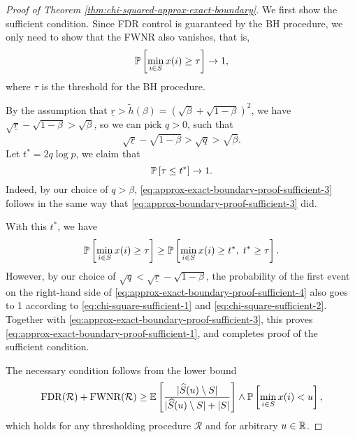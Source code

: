\begin{proof}[Proof of Theorem \ref{thm:chi-squared-approx-exact-boundary}]
We first show the sufficient condition.
Since FDR control is guaranteed by the BH procedure, we only need to show that the FWNR also vanishes, that is,
\begin{equation} \label{eq:approx-exact-boundary-proof-sufficient-1}
    \P\left[\min_{i\in S}x(i) \ge \tau\right] \to 1,
\end{equation}
where $\tau$ is the threshold for the BH procedure.

By the assumption that $\underline{r}>\widetilde{h}(\beta)=(\sqrt{\beta}+\sqrt{1-\beta})^2$, we have $\sqrt{\underline{r}}-\sqrt{1-\beta}>\sqrt{\beta}$, so we can pick $q>0$, such that 
\begin{equation} \label{eq:approx-exact-boundary-proof-sufficient-2}
\sqrt{\underline{r}}-\sqrt{1-\beta}>\sqrt{q}>\sqrt{\beta}.
\end{equation}
Let $t^*=2q\log{p}$, we claim that 
\begin{equation} \label{eq:approx-exact-boundary-proof-sufficient-3}
\P\left[\tau\le t^*\right]\to 1.
\end{equation}
Indeed, by our choice of $q>\beta$, \eqref{eq:approx-exact-boundary-proof-sufficient-3} follows in the same way that \eqref{eq:approx-boundary-proof-sufficient-3} did.

With this $t^*$, we have
\begin{equation} \label{eq:approx-exact-boundary-proof-sufficient-4}
    \P\left[\min_{i\in S}x(i) \ge \tau\right] \ge 
    \P\left[\min_{i\in S}x(i) \ge t^*,\; t^* \ge \tau\right].
\end{equation}
However, by our choice of $\sqrt{q} < \sqrt{\underline{r}}-\sqrt{1-\beta}$, the probability of the first event on the right-hand side of \eqref{eq:approx-exact-boundary-proof-sufficient-4} also goes to 1 according to \eqref{eq:chi-square-sufficient-1} and \eqref{eq:chi-square-sufficient-2}.
Together with \eqref{eq:approx-exact-boundary-proof-sufficient-3}, this proves \eqref{eq:approx-exact-boundary-proof-sufficient-1}, and completes proof of the sufficient condition.

The necessary condition follows from the lower bound
\begin{equation} \label{eq:approx-exact-boundary-proof-necessary-1}
    \mathrm{FDR}(\mathcal{R}) + \mathrm{FWNR}(\mathcal{R}) \ge \E\left[\frac{|\widehat{S}(u)\setminus S|}{|\widehat{S}(u)\setminus S| + |S|}\right] \wedge 
    \P\left[\min_{i\in S}x(i)<u\right],
\end{equation}
which holds for any thresholding procedure $\mathcal{R}$ and for arbitrary $u\in\mathbb R$.


\end{proof}
